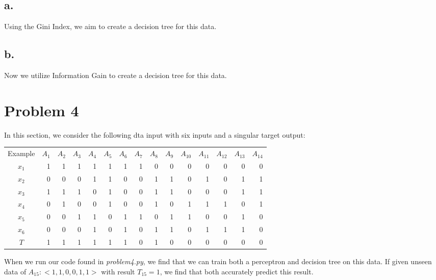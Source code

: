 \documentclass{article}
\begin{document}
\subsection*{a.}

Using the Gini Index, we aim to create a decision tree for this data.

\subsection*{b.}

Now we utilize Information Gain to create a decision tree for this data.

\section*{Problem 4}

In this section, we consider the following dta input with six inputs and a singular target output:

\begin{center}
    \begin{tabular}{c r r r r r r r r r r r r r r}
        Example & $A_1$ & $A_2$ & $A_3$ & $A_4$ & $A_5$ & $A_6$ & $A_7$ & $A_8$ & $A_9$ & $A_10$ & $A_11$ & $A_12$ & $A_13$ & $A_14$ \\
        $x_1$ & 1 & 1 & 1 & 1 & 1 & 1 & 1 & 0 & 0 & 0 & 0 & 0 & 0 & 0 \\
        $x_2$ & 0 & 0 & 0 & 1 & 1 & 0 & 0 & 1 & 1 & 0 & 1 & 0 & 1 & 1 \\
        $x_3$ & 1 & 1 & 1 & 0 & 1 & 0 & 0 & 1 & 1 & 0 & 0 & 0 & 1 & 1 \\
        $x_4$ & 0 & 1 & 0 & 0 & 1 & 0 & 0 & 1 & 0 & 1 & 1 & 1 & 0 & 1 \\
        $x_5$ & 0 & 0 & 1 & 1 & 0 & 1 & 1 & 0 & 1 & 1 & 0 & 0 & 1 & 0 \\
        $x_6$ & 0 & 0 & 0 & 1 & 0 & 1 & 0 & 1 & 1 & 0 & 1 & 1 & 1 & 0 \\
        $T$ & 1 & 1 & 1 & 1 & 1 & 1 & 0 & 1 & 0 & 0 & 0 & 0 & 0 & 0 \\

    \end{tabular}
\end{center}

When we run our code found in \textit{problem4.py}, we find that we can train both a perceptron and decision tree on this data. If given unseen data of $A_{15}:<1, 1, 0, 0, 1, 1>$ with result $T_{15}=1$, we find that both accurately predict this result.
\end{document}
